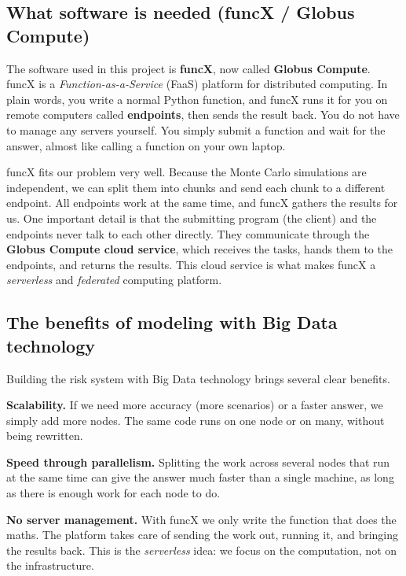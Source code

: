 \documentclass[11pt,a4paper]{article}
\begin{document}
\subsection{What software is needed (funcX / Globus Compute)}

The software used in this project is \textbf{funcX}, now called \textbf{Globus Compute}. funcX is a \textit{Function-as-a-Service} (FaaS) platform for distributed computing. In plain words, you write a normal Python function, and funcX runs it for you on remote computers called \textbf{endpoints}, then sends the result back. You do not have to manage any servers yourself. You simply submit a function and wait for the answer, almost like calling a function on your own laptop.

funcX fits our problem very well. Because the Monte Carlo simulations are independent, we can split them into chunks and send each chunk to a different endpoint. All endpoints work at the same time, and funcX gathers the results for us. One important detail is that the submitting program (the client) and the endpoints never talk to each other directly. They communicate through the \textbf{Globus Compute cloud service}, which receives the tasks, hands them to the endpoints, and returns the results. This cloud service is what makes funcX a \textit{serverless} and \textit{federated} computing platform.

\subsection{The benefits of modeling with Big Data technology}

Building the risk system with Big Data technology brings several clear benefits.

\textbf{Scalability.} If we need more accuracy (more scenarios) or a faster answer, we simply add more nodes. The same code runs on one node or on many, without being rewritten.

\textbf{Speed through parallelism.} Splitting the work across several nodes that run at the same time can give the answer much faster than a single machine, as long as there is enough work for each node to do.

\textbf{No server management.} With funcX we only write the function that does the maths. The platform takes care of sending the work out, running it, and bringing the results back. This is the \textit{serverless} idea: we focus on the computation, not on the infrastructure.
\end{document}
